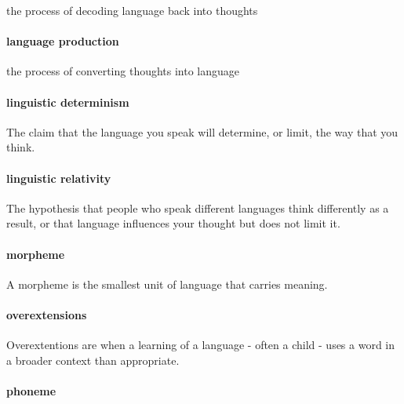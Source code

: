 \documentclass[
]{krantz}
\begin{document}
the process of decoding language back into thoughts

\hypertarget{langproddef}{%
\paragraph*{language production}\label{langproddef}}

the process of converting thoughts into language

\hypertarget{linguistic-determinism}{%
\paragraph*{linguistic determinism}\label{linguistic-determinism}}

The claim that the language you speak will determine, or limit, the way that you think.

\hypertarget{linguistic-relativity}{%
\paragraph*{linguistic relativity}\label{linguistic-relativity}}

The hypothesis that people who speak different languages think differently as a result, or that language influences your thought but does not limit it.

\hypertarget{morpheme}{%
\paragraph*{morpheme}\label{morpheme}}

A morpheme is the smallest unit of language that carries meaning.

\hypertarget{overextensions}{%
\paragraph*{overextensions}\label{overextensions}}

Overextentions are when a learning of a language - often a child - uses a word in a broader context than appropriate.

\hypertarget{phoneme}{%
\paragraph*{phoneme}\label{phoneme}}
\end{document}
